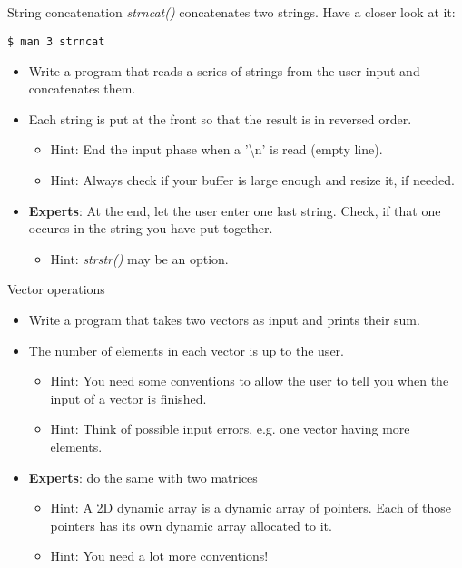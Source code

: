 \subsection{}
\begin{frame}[fragile]{String concatenation}
	\textit{strncat()} concatenates two strings. Have a closer look at it:
	\begin{lstlisting}[numbers=none]
$ man 3 strncat
\end{lstlisting}
	\begin{itemize}
		\item Write a program that reads a series of strings from the user input and concatenates them.
		\item Each string is put at the front so that the result is in reversed order.
		\begin{itemize}
			\item<2-> Hint: End the input phase when a '\textbackslash n' is read (empty line).
			\item<3-> Hint: Always check if your buffer is large enough and resize it, if needed.
		\end{itemize}
		\item \textbf{Experts}: At the end, let the user enter one last string. Check, if that one occures in the string you have put together.
		\begin{itemize}
			\item<4-> Hint: \textit{strstr()} may be an option.
		\end{itemize}
	\end{itemize}		
\end{frame}
\begin{frame}{Vector operations}
	\begin{itemize}
		\item Write a program that takes two vectors as input and prints their sum.
		\item The number of elements in each vector is up to the user.
		\begin{itemize}
			\item<2-> Hint: You need some conventions to allow the user to tell you when the input of a vector is finished.
			\item<3-> Hint: Think of possible input errors, e.g. one vector having more elements.
		\end{itemize}
		\item \textbf{Experts}: do the same with two matrices
		\begin{itemize}
			\item<4-> Hint: A 2D dynamic array is a dynamic array of pointers. Each of those pointers has its own dynamic array allocated to it.
			\item<5-> Hint: You need a lot more conventions!
		\end{itemize}
	\end{itemize}
\end{frame}
